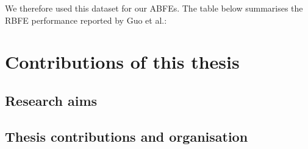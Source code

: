 We therefore used this dataset for our ABFEs. The table below summarises the RBFE performance reported by Guo et al.:




\section{Contributions of this thesis}
\subsection{Research aims}

\subsection{Thesis contributions and organisation}
\lipsum[1][1-3]
